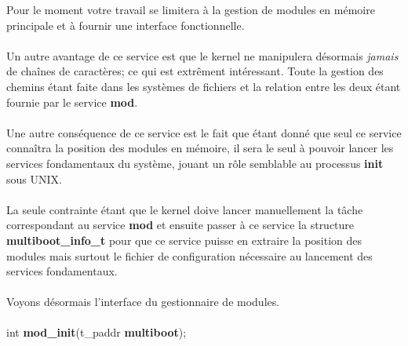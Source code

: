 \documentclass[10pt,a4wide]{article}
\begin{document}
Pour le moment votre travail se limitera \`a la gestion de modules
en m\'emoire principale et \`a fournir une interface fonctionnelle.

\paragraph{}

Un autre avantage de ce service est que le kernel ne manipulera d\'esormais
\textit{jamais} de cha\^ines de caract\`eres; ce qui est extr\^ement
int\'eressant. Toute la gestion des chemins \'etant faite dans les
syst\`emes de fichiers et la relation entre les deux \'etant fournie
par le service \textbf{mod}.

\paragraph{}

Une autre cons\'equence de ce service est le fait que \'etant donn\'e que
seul ce service conna\^itra la position des modules en m\'emoire, il
sera le seul \`a pouvoir lancer les services fondamentaux du syst\`eme, jouant
un r\^ole semblable au processus \textbf{init} sous UNIX.

\paragraph{}

La seule contrainte \'etant que le kernel doive lancer manuellement la
t\^ache correspondant au service \textbf{mod} et ensuite passer \`a ce
service la structure \textbf{multiboot\_info\_t} pour que ce service
puisse en extraire la position des modules mais surtout le fichier de
configuration n\'ecessaire au lancement des services fondamentaux.

\paragraph{}

Voyons d\'esormais l'interface du gestionnaire de modules.

\paragraph{}

\hspace{1.5cm}int \textbf{mod\_init}(t\_paddr \textbf{multiboot});

\paragraph{}
\end{document}
